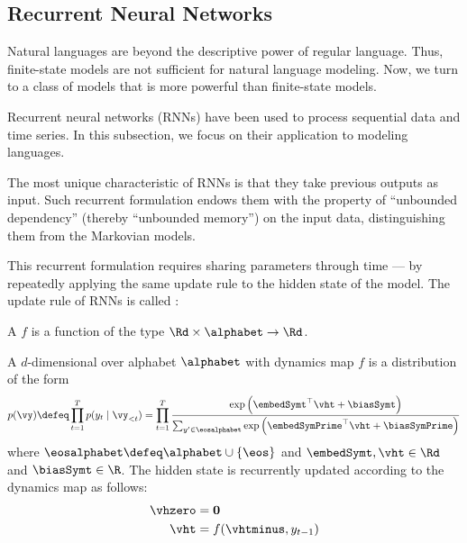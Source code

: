 

\subsection{Recurrent Neural Networks} \label{sec:rnns}
Natural languages are beyond the descriptive power of regular language. Thus, finite-state models are not sufficient for natural language modeling.
Now, we turn to a class of models that is more powerful than finite-state models. 

Recurrent neural networks (RNNs) have been used to process sequential data and time series. 
In this subsection, we focus on their application to modeling languages.

The most unique characteristic of RNNs is that they take previous outputs as input. Such recurrent formulation endows them with the property of ``unbounded dependency'' (thereby ``unbounded memory'') on the input data, distinguishing them from the Markovian \ngram{} models. 


This recurrent formulation requires sharing parameters through time --- by repeatedly applying the same update rule to the hidden state of the model.
The update rule of RNNs is called :

\begin{definition}
A  $f$ is a function of the type $\Rd \times \alphabet \rightarrow \Rd$. 
\end{definition}

\begin{definition}\label{def:recurrent-neural-language-model}
A $d$-dimensional  over alphabet $\alphabet$ with dynamics map $f$ is a distribution of the form
\begin{equation}
p(\vy) \defeq \prod_{t=1}^T p(y_t \mid \vy_{<t}) = \prod_{t=1}^T \frac{\exp\left(\embedSymt^{\top} \vht + \biasSymt \right) }{\sum_{y' \in \eosalphabet} \exp\left(\embedSymPrime^{\top} \vht+ \biasSymPrime\right)} 
\end{equation}
where $\eosalphabet \defeq \alphabet \cup \{\eos\}$ and $\embedSymt, \vht \in \Rd$ and $\biasSymt \in \R$.
The hidden state is recurrently updated according to the dynamics map as follows:
\begin{align}
    \vhzero &= \mathbf{0} \\
    \vht    &= f(\vhtminus, y_{t-1})
\end{align}
\end{definition}




